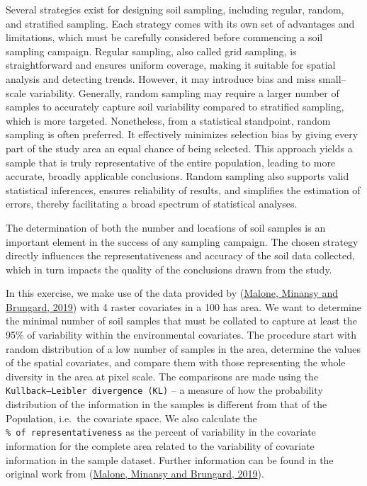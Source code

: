 \documentclass[
  10pt,
  b5paper,
  oneside]{book}
\begin{document}
Several strategies exist for designing soil sampling, including regular, random, and stratified sampling. Each strategy comes with its own set of advantages and limitations, which must be carefully considered before commencing a soil sampling campaign. Regular sampling, also called grid sampling, is straightforward and ensures uniform coverage, making it suitable for spatial analysis and detecting trends. However, it may introduce bias and miss small--scale variability. Generally, random sampling may require a larger number of samples to accurately capture soil variability compared to stratified sampling, which is more targeted. Nonetheless, from a statistical standpoint, random sampling is often preferred. It effectively minimizes selection bias by giving every part of the study area an equal chance of being selected. This approach yields a sample that is truly representative of the entire population, leading to more accurate, broadly applicable conclusions. Random sampling also supports valid statistical inferences, ensures reliability of results, and simplifies the estimation of errors, thereby facilitating a broad spectrum of statistical analyses.

The determination of both the number and locations of soil samples is an important element in the success of any sampling campaign. The chosen strategy directly influences the representativeness and accuracy of the soil data collected, which in turn impacts the quality of the conclusions drawn from the study.

In this exercise, we make use of the data provided by (\protect\hyperlink{ref-Malone}{Malone, Minansy and Brungard, 2019}) with 4 raster covariates in a 100 has area. We want to determine the minimal number of soil samples that must be collated to capture at least the 95\% of variability within the environmental covariates. The procedure start with random distribution of a low number of samples in the area, determine the values of the spatial covariates, and compare them with those representing the whole diversity in the area at pixel scale. The comparisons are made using the \texttt{\textquotesingle{}Kullback–Leibler\ divergence\ (KL)\textquotesingle{}} -- a measure of how the probability distribution of the information in the samples is different from that of the Population, i.e.~the covariate space. We also calculate the \texttt{\textquotesingle{}\%\ of\ representativeness\textquotesingle{}} as the percent of variability in the covariate information for the complete area related to the variability of covariate information in the sample dataset. Further information can be found in the original work from (\protect\hyperlink{ref-Malone}{Malone, Minansy and Brungard, 2019}).
\end{document}
